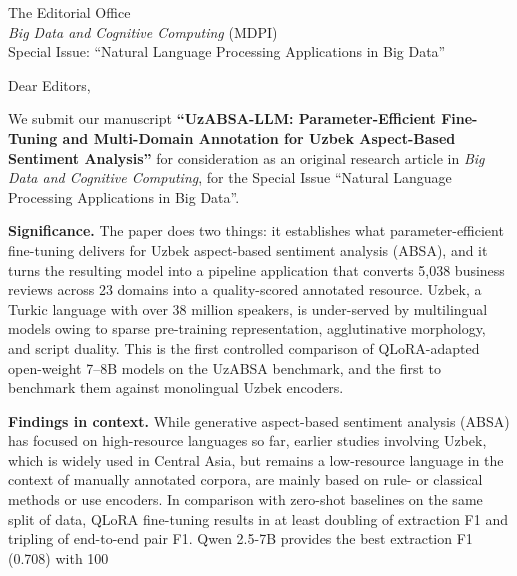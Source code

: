 \documentclass[11pt]{letter}
\begin{document}
\begin{letter}{%
  The Editorial Office\\
  \textit{Big Data and Cognitive Computing} (MDPI)\\
  Special Issue: ``Natural Language Processing Applications in Big Data''}

\opening{Dear Editors,}

We submit our manuscript \textbf{``UzABSA-LLM: Parameter-Efficient Fine-Tuning and Multi-Domain Annotation for Uzbek Aspect-Based Sentiment Analysis''} for consideration as an original research article in \textit{Big Data and Cognitive Computing}, for the Special Issue ``Natural Language Processing Applications in Big Data''.

\textbf{Significance.} The paper does two things: it establishes what parameter-efficient fine-tuning delivers for Uzbek aspect-based sentiment analysis (ABSA), and it turns the resulting model into a pipeline application that converts 5{,}038 business reviews across 23 domains into a quality-scored annotated resource. Uzbek, a Turkic language with over 38 million speakers, is under-served by multilingual models owing to sparse pre-training representation, agglutinative morphology, and script duality. This is the first controlled comparison of QLoRA-adapted open-weight 7--8B models on the UzABSA benchmark, and the first to benchmark them against monolingual Uzbek encoders.

\textbf{Findings in context.} While generative aspect-based sentiment analysis (ABSA) has focused on high-resource languages so far, earlier studies involving Uzbek, which is widely used in Central Asia, but remains a low-resource language in the context of manually annotated corpora, are mainly based on rule- or classical methods or use encoders. In comparison with zero-shot baselines on the same split of data, QLoRA fine-tuning results in at least doubling of extraction F1 and tripling of end-to-end pair F1. Qwen 2.5-7B provides the best extraction F1 (0.708) with 100%


\end{letter}
\end{document}
